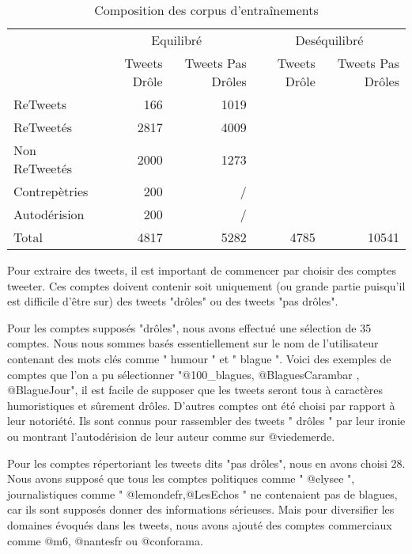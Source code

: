 \documentclass[10pt,a4paper,twoside]{article}
\begin{document}
\begin{table}[!h]
\centering
	\begin{tabular}{lrrrr}
	\toprule
	& \multicolumn{2}{c}{Equilibré}  & \multicolumn{2}{c}{Deséquilibré}\\
	\cmidrule(r){2-3} \cmidrule(r){4-5}

	& Tweets Drôle & Tweets Pas Drôles &  Tweets Drôle & Tweets Pas Drôles \\
	\midrule
	 ReTweets & 166 & 1019 &   & \\
	
	 ReTweetés & 2817 & 4009 & & \\
	
	Non ReTweetés & 2000 & 1273 & &\\
	
	Contrepètries & 200 & / & & \\
	Autodérision & 200 & / & & \\
	 \midrule
	Total & 4817 & 5282 & 4785 &  10541 \\
	\bottomrule
	\end{tabular}
\caption{Composition des corpus d'entraînements}
\end{table}


Pour extraire des tweets, il est important de commencer par choisir des comptes tweeter. Ces comptes doivent contenir soit uniquement (ou grande partie puisqu'il est difficile d'être sur) des tweets "drôles" ou des tweets "pas drôles".

Pour les comptes supposés "drôles", nous avons effectué une sélection de 35 comptes. Nous nous sommes basés essentiellement sur le nom de l'utilisateur contenant des mots clés comme " humour " et " blague ". Voici des exemples de comptes que l'on a pu sélectionner "@100\_blagues, @BlaguesCarambar , @BlagueJour", il est facile de supposer que les tweets seront tous à caractères humoristiques et sûrement drôles. D'autres comptes ont été choisi par rapport à leur notoriété. Ils sont connus pour rassembler des tweets " drôles " par leur ironie ou montrant l'autodérision de leur auteur comme sur @viedemerde.

Pour les comptes répertoriant les tweets dits "pas drôles", nous en avons choisi 28. Nous avons supposé que tous les comptes politiques comme " @elysee ", journalistiques comme " @lemondefr,@LesEchos " ne contenaient pas de blagues, car ils sont supposés donner des informations sérieuses. Mais pour diversifier les domaines évoqués dans les tweets, nous avons ajouté des comptes commerciaux comme @m6, @nantesfr ou @conforama.
\end{document}
